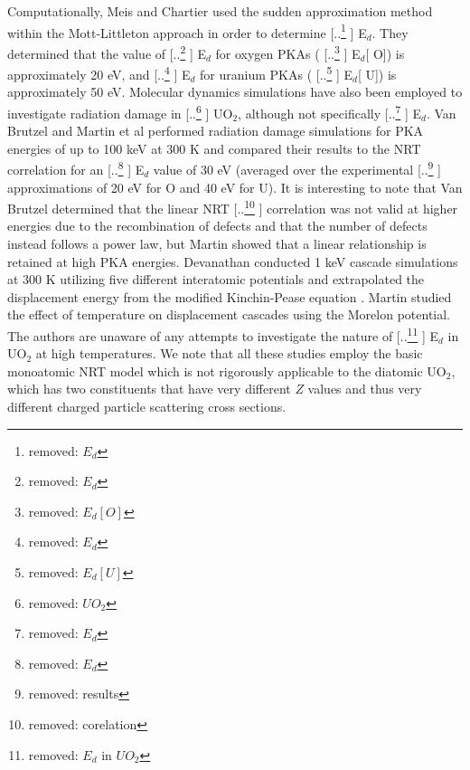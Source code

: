 \documentclass[review]{elsarticle} %
\providecommand{\DIFaddtex}[1]{{\protect\color{blue} \sf #1}} %
\providecommand{\DIFdeltex}[1]{{\protect\color{red} [..\footnote{removed: #1} ]}} %
\providecommand{\DIFaddbegin}{} %
\providecommand{\DIFaddend}{} %
\providecommand{\DIFdelbegin}{} %
\providecommand{\DIFdelend}{} %
\providecommand{\DIFadd}[1]{\texorpdfstring{\DIFaddtex{#1}}{#1}} %
\providecommand{\DIFdel}[1]{\texorpdfstring{\DIFdeltex{#1}}{}} %
\newcommand{\DIFscaledelfig}{0.5}
\newlength{\DIFdelgraphicswidth} %
\newlength{\DIFdelgraphicsheight} %
\newcommand{\DIFaddincludegraphics}[2][]{{\color{blue}\fbox{\DIFOincludegraphics[#1]{#2}}}} %
\newcommand{\DIFdelincludegraphics}[2][]{%
\sbox{\DIFdelgraphicsbox}{\DIFOincludegraphics[#1]{#2}}%
\settoboxwidth{\DIFdelgraphicswidth}{\DIFdelgraphicsbox} %
\settoboxtotalheight{\DIFdelgraphicsheight}{\DIFdelgraphicsbox} %
\scalebox{\DIFscaledelfig}{%
\parbox[b]{\DIFdelgraphicswidth}{\usebox{\DIFdelgraphicsbox}\\[-\baselineskip] \rule{\DIFdelgraphicswidth}{0em}}\llap{\resizebox{\DIFdelgraphicswidth}{\DIFdelgraphicsheight}{%
\setlength{\unitlength}{\DIFdelgraphicswidth}%
\begin{picture}(1,1)%
\thicklines\linethickness{2pt} %
{\color[rgb]{1,0,0}\put(0,0){\framebox(1,1){}}}%
{\color[rgb]{1,0,0}\put(0,0){\line( 1,1){1}}}%
{\color[rgb]{1,0,0}\put(0,1){\line(1,-1){1}}}%
\end{picture}%
}\hspace*{3pt}}} %
} %
\DeclareRobustCommand{\DIFaddbegin}{\DIFOaddbegin \let\includegraphics\DIFaddincludegraphics} %
\DeclareRobustCommand{\DIFaddend}{\DIFOaddend \let\includegraphics\DIFOincludegraphics} %
\DeclareRobustCommand{\DIFdelbegin}{\DIFOdelbegin \let\includegraphics\DIFdelincludegraphics} %
\DeclareRobustCommand{\DIFdelend}{\DIFOaddend \let\includegraphics\DIFOincludegraphics} %
\begin{document}
Computationally, Meis and Chartier \cite{meis2005} used the sudden approximation method within the Mott-Littleton approach \cite{Litt} in order to determine \DIFdelbegin \DIFdel{$E_d$}\DIFdelend \DIFaddbegin \DIFadd{E$_d$}\DIFaddend . They determined that the value of \DIFdelbegin \DIFdel{$E_d$ }\DIFdelend \DIFaddbegin \DIFadd{E$_d$ }\DIFaddend for oxygen PKAs (\DIFdelbegin \DIFdel{$E_d [O]$}\DIFdelend \DIFaddbegin \DIFadd{E$_d$}[\DIFadd{O}]\DIFaddend ) is approximately 20 eV, and \DIFdelbegin \DIFdel{$E_d$ }\DIFdelend \DIFaddbegin \DIFadd{E$_d$ }\DIFaddend for uranium PKAs (\DIFdelbegin \DIFdel{$E_d [U]$}\DIFdelend \DIFaddbegin \DIFadd{E$_d$}[\DIFadd{U}]\DIFaddend ) is approximately 50 eV. Molecular dynamics simulations have also been employed to investigate radiation damage in \DIFdelbegin \DIFdel{$UO_2$}\DIFdelend \DIFaddbegin \DIFadd{UO$_2$}\DIFaddend , although not specifically \DIFdelbegin \DIFdel{$E_d$}\DIFdelend \DIFaddbegin \DIFadd{E$_d$}\DIFaddend . Van Brutzel \cite{vanbrutzel2003,vanbrutzel2006} and Martin et al \cite{martin2011} performed radiation damage simulations for PKA energies of up to 100 keV at 300 K and compared their results to the NRT correlation for an \DIFdelbegin \DIFdel{$E_d$ }\DIFdelend \DIFaddbegin \DIFadd{E$_d$ }\DIFaddend value of 30 eV (averaged over the experimental \DIFdelbegin \DIFdel{results }\DIFdelend \DIFaddbegin \DIFadd{approximations }\DIFaddend of 20 eV for O and 40 eV for U). It is interesting to note that Van Brutzel determined that the linear NRT \DIFdelbegin \DIFdel{corelation }\DIFdelend \DIFaddbegin \DIFadd{correlation }\DIFaddend was not valid at higher energies due to the recombination of defects and that the number of defects instead follows a power law, but Martin showed that a linear relationship is retained at high PKA energies. Devanathan \cite{devanathan2009} conducted 1 keV cascade simulations at 300 K utilizing five different interatomic potentials and extrapolated the displacement energy from the modified Kinchin-Pease equation \cite{kinchinpease}. Martin \cite{martin2015, martin2014} studied the effect of temperature on displacement cascades using the Morelon \cite{morelon2003} potential. The authors are unaware of any attempts to investigate the nature of \DIFdelbegin \DIFdel{$E_d$ in $UO_2$ }\DIFdelend \DIFaddbegin \DIFadd{E$_d$ in UO$_2$ }\DIFaddend at high temperatures. We note that all these studies employ the basic monoatomic NRT model which is not rigorously applicable to the diatomic UO$_2$, which has two constituents that have very different $Z$ values and thus very different charged particle scattering cross sections.
\end{document}
